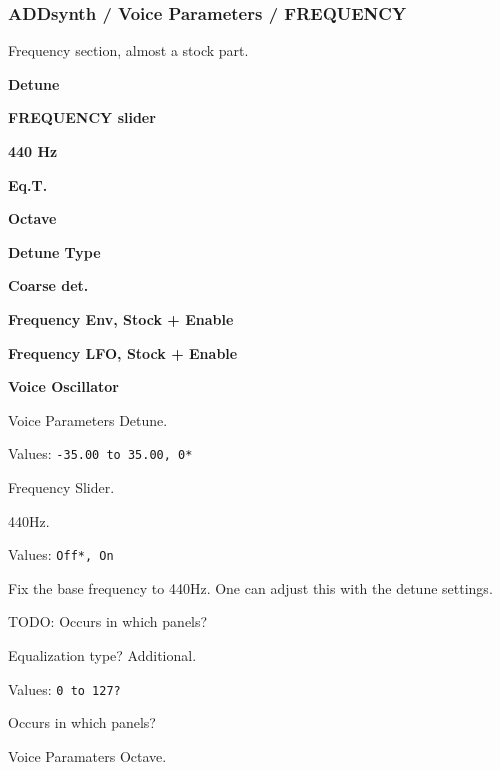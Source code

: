 \subsubsection{ADDsynth / Voice Parameters / FREQUENCY}
\label{subsubsec:addsynth_voice_parameters_frequency}


   Frequency section, almost a stock part.

   \begin{enumber}
      \item \textbf{Detune}
      \item \textbf{FREQUENCY slider}
      \item \textbf{440 Hz}         %
      \item \textbf{Eq.T.}          %
      \item \textbf{Octave}
      \item \textbf{Detune Type}
      \item \textbf{Coarse det.}
      \item \textbf{Frequency Env, Stock + Enable}
      \item \textbf{Frequency LFO, Stock + Enable}
      \item \textbf{Voice Oscillator}
   \end{enumber}

   \setcounter{ItemCounter}{0}      %

   Voice Parameters Detune.

   Values: \texttt{-35.00 to 35.00, 0*}

   Frequency Slider.

   440Hz.

   Values: \texttt{Off*, On}

   Fix the base frequency to 440Hz.
   One can adjust this with the detune settings.

   TODO: Occurs in which panels?

   Equalization type?  Additional.

   Values: \texttt{0 to 127?}

   Occurs in which panels?

   Voice Paramaters Octave.

